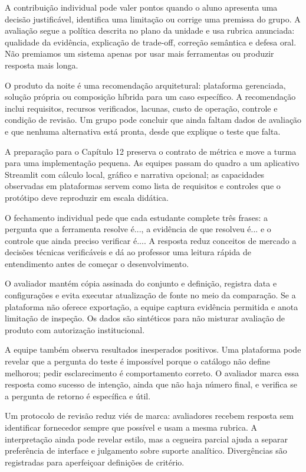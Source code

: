 A contribuição individual pode valer pontos quando o aluno apresenta uma decisão justificável, identifica uma limitação ou corrige uma premissa do grupo. A avaliação segue a política descrita no plano da unidade e usa rubrica anunciada: qualidade da evidência, explicação de trade-off, correção semântica e defesa oral. Não premiamos um sistema apenas por usar mais ferramentas ou produzir resposta mais longa.

O produto da noite é uma recomendação arquitetural: plataforma gerenciada, solução própria ou composição híbrida para um caso específico. A recomendação inclui requisitos, recursos verificados, lacunas, custo de operação, controle e condição de revisão. Um grupo pode concluir que ainda faltam dados de avaliação e que nenhuma alternativa está pronta, desde que explique o teste que falta.

A preparação para o Capítulo 12 preserva o contrato de métrica e move a turma para uma implementação pequena. As equipes passam do quadro a um aplicativo Streamlit com cálculo local, gráfico e narrativa opcional; as capacidades observadas em plataformas servem como lista de requisitos e controles que o protótipo deve reproduzir em escala didática.

O fechamento individual pede que cada estudante complete três frases: a pergunta que a ferramenta resolve é..., a evidência de que resolveu é... e o controle que ainda preciso verificar é.... A resposta reduz conceitos de mercado a decisões técnicas verificáveis e dá ao professor uma leitura rápida de entendimento antes de começar o desenvolvimento.

O avaliador mantém cópia assinada do conjunto e definição, registra data e configurações e evita executar atualização de fonte no meio da comparação. Se a plataforma não oferece exportação, a equipe captura evidência permitida e anota limitação de inspeção. Os dados são sintéticos para não misturar avaliação de produto com autorização institucional.

A equipe também observa resultados inesperados positivos. Uma plataforma pode revelar que a pergunta do teste é impossível porque o catálogo não define melhorou; pedir esclarecimento é comportamento correto. O avaliador marca essa resposta como sucesso de intenção, ainda que não haja número final, e verifica se a pergunta de retorno é específica e útil.

Um protocolo de revisão reduz viés de marca: avaliadores recebem resposta sem identificar fornecedor sempre que possível e usam a mesma rubrica. A interpretação ainda pode revelar estilo, mas a cegueira parcial ajuda a separar preferência de interface e julgamento sobre suporte analítico. Divergências são registradas para aperfeiçoar definições de critério.

